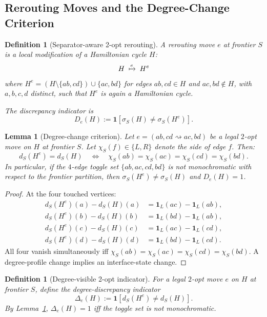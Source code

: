 \documentclass[11pt]{article}
\newtheorem{lemma}[theorem]{Lemma}
\newtheorem{definition}[theorem]{Definition}
\begin{document}
\subsection{Rerouting Moves and the Degree-Change Criterion}

\begin{definition}[Separator-aware 2-opt rerouting]
\label{def:rerouting}
A \emph{rerouting move} $e$ at frontier $S$ is a local
modification of a Hamiltonian cycle $H$:
\[
  H \;\xmapsto{e}\; H^e
\]
where $H^e = (H \setminus \{ab, cd\}) \cup \{ac, bd\}$
for edges $ab, cd \in H$ and $ac, bd \notin H$, with
$a, b, c, d$ distinct, such that $H^e$ is again a
Hamiltonian cycle.

The \emph{discrepancy indicator} is
\[
  D_e(H) := \mathbf{1}[\sigma_S(H) \neq \sigma_S(H^e)].
\]
\end{definition}

\begin{lemma}[Degree-change criterion]
\label{lem:degree-change-criterion}
Let $e = (ab, cd \rightsquigarrow ac, bd)$ be a legal
$2$-opt move on $H$ at frontier $S$. Let
$\chi_S(f) \in \{L, R\}$ denote the side of edge $f$.
Then:
\[
d_S(H^e) = d_S(H) \quad\Longleftrightarrow\quad
\chi_S(ab) = \chi_S(ac) = \chi_S(cd) = \chi_S(bd).
\]
In particular, if the $4$-edge toggle set
$\{ab, ac, cd, bd\}$ is not monochromatic with respect
to the frontier partition, then
$\sigma_S(H^e) \neq \sigma_S(H)$ and $D_e(H) = 1$.
\end{lemma}

\begin{proof}
At the four touched vertices:
\begin{align*}
d_S(H^e)(a) - d_S(H)(a) &= \mathbf{1}_L(ac) - \mathbf{1}_L(ab), \\
d_S(H^e)(b) - d_S(H)(b) &= \mathbf{1}_L(bd) - \mathbf{1}_L(ab), \\
d_S(H^e)(c) - d_S(H)(c) &= \mathbf{1}_L(ac) - \mathbf{1}_L(cd), \\
d_S(H^e)(d) - d_S(H)(d) &= \mathbf{1}_L(bd) - \mathbf{1}_L(cd).
\end{align*}
All four vanish simultaneously iff
$\chi_S(ab) = \chi_S(ac) = \chi_S(cd) = \chi_S(bd)$.
A degree-profile change implies an interface-state change.
\end{proof}

\begin{definition}[Degree-visible 2-opt indicator]
\label{def:degree-visible}
For a legal $2$-opt move $e$ on $H$ at frontier $S$, define the
\emph{degree-discrepancy indicator}
\[
\Delta_e(H) := \mathbf{1}[d_S(H^e) \neq d_S(H)].
\]
By Lemma~\ref{lem:degree-change-criterion},
$\Delta_e(H) = 1$ iff the toggle set is not monochromatic.
\end{definition}
\end{document}
